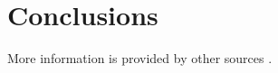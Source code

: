 \chapter{Conclusions}
\label{ch:conclusion}
{
More information is provided by other sources \cite{mittelbach2004latex, goossens1994latex}.
}